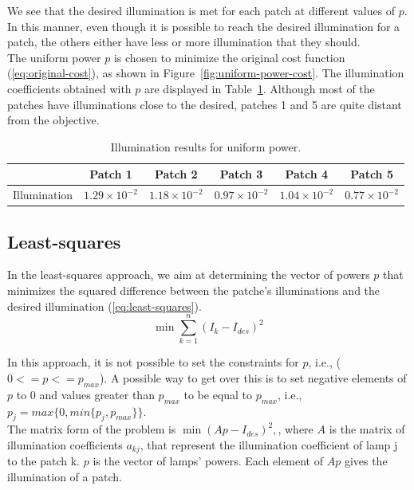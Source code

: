 \documentclass[11pt,a4paper]{article}
\begin{document}
We see that the desired illumination is met for each patch at different values of $p$. In this manner, even though it is possible to reach the desired illumination for a patch, the others either have less or more illumination that they should.\\

The uniform power $p$ is chosen to minimize the original cost function (\ref{eq:original-cost}), as shown in Figure~\ref{fig:uniform-power-cost}. The illumination coefficients obtained with $p$ are displayed in Table~\ref{tab:uniform-power}. Although most of the patches have illuminations close to the desired, patches 1 and 5 are quite distant from the objective.

\begin{table}[!htb]
    \centering
    \caption{Illumination results for uniform power.}
    \begin{tabular}{lccccc}
        \hline
        & Patch 1 & Patch 2 & Patch 3 & Patch 4 & Patch 5\\
        \hline
        Illumination & $1.29\times10^{-2}$ & $1.18\times10^{-2}$ & $0.97\times10^{-2}$ & $1.04\times10^{-2}$ & $0.77\times10^{-2}$\\
        \hline
    \end{tabular}\label{tab:uniform-power}
\end{table}

\subsection{Least-squares}

In the least-squares approach, we aim at determining the vector of powers $p$ that minimizes the squared difference between the patche's illuminations and the desired illumination (\ref{eq:least-squares}).
\begin{equation}
    \min \displaystyle \sum_{k=1}^{n} (I_k - I_{des})^2
    \label{eq:least-squares}
\end{equation}

In this approach, it is not possible to set the constraints for $p$, i.e., ($0 <= p <= p_{max}$). A possible way to get over this is to set negative elements of $p$ to 0 and values greater than $p_{max}$ to be equal to $p_{max}$, i.e., $p_j = max\{0, min\{p_j, p_{max}\}\}$.\\


The matrix form of the problem is $\min (Ap - I_{des})^2,$, where $A$ is the matrix of illumination coefficients $a_{kj}$, that represent the illumination coefficient of lamp j to the patch k. $p$ is the vector of lamps' powers. Each element of $Ap$ gives the illumination of a patch.\\
\end{document}
